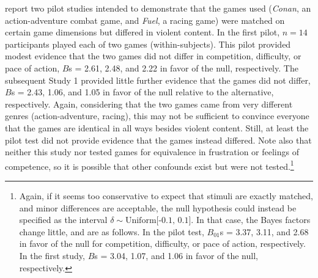 \documentclass[man]{apa6}
\begin{document}
\citet{Adachi:Willoughby:2011} report two pilot studies intended to demonstrate that the games used ({\em Conan}, an action-adventure combat game, and {\em Fuel}, a racing game) were matched on certain game dimensions but differed in violent content. In the first pilot, $n = 14$ participants played each of two games (within-subjects). This pilot provided modest evidence that the two games did not differ in competition, difficulty, or pace of action, $B$s = 2.61, 2.48, and 2.22 in favor of the null, respectively. The subsequent Study 1 provided little further evidence that the games did not differ, $B$s = 2.43, 1.06, and 1.05 in favor of the null relative to the alternative, respectively. Again, considering that the two games came from very different genres (action-adventure, racing), this may not be sufficient to convince everyone that the games are identical in all ways besides violent content. Still, at least the pilot test did not provide evidence that the games instead differed. Note also that neither this study nor \citet{Valadez:Ferguson:2012} tested games for equivalence in frustration or feelings of competence, so it is possible that other confounds exist but were not tested.\footnote{Again, if it seems too conservative to expect that stimuli are exactly matched, and minor differences are acceptable, the null hypothesis could instead be specified as the interval $\delta \sim \mbox{Uniform[-0.1, 0.1]}$. In that case, the Bayes factors change little, and are as follows. In the pilot test, $B_{01}$s = 3.37, 3.11, and 2.68 in favor of the null for competition, difficulty, or pace of action, respectively. In the first study, $B$s = 3.04, 1.07, and 1.06 in favor of the null, respectively.}
\end{document}
